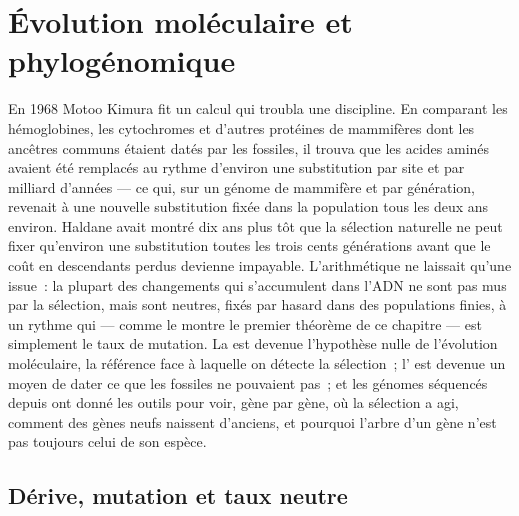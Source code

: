 \chapter{Évolution moléculaire et phylogénomique}\label{ch:b3:molecular-evolution}

En 1968 Motoo Kimura fit un calcul qui troubla une discipline. En
comparant les hémoglobines, les cytochromes et d'autres protéines de
mammifères dont les ancêtres communs étaient datés par les fossiles, il
trouva que les acides aminés avaient été remplacés au rythme d'environ
une substitution par site et par milliard d'années --- ce qui, sur un
génome de mammifère et par génération, revenait à une nouvelle
substitution fixée dans la population tous les deux ans environ. Haldane
avait montré dix ans plus tôt que la sélection naturelle ne peut fixer
qu'environ une substitution toutes les trois cents générations avant que
le coût en descendants perdus devienne impayable. L'arithmétique ne
laissait qu'une issue~: la plupart des changements qui s'accumulent dans
l'ADN ne sont pas mus par la sélection, mais sont neutres, fixés par
hasard dans des populations finies, à un rythme qui --- comme le montre
le premier théorème de ce chapitre --- est simplement le taux de
mutation. La  est devenue l'hypothèse nulle de
l'évolution moléculaire, la référence face à laquelle on détecte la
sélection~; l' est devenue un moyen de dater ce que
les fossiles ne pouvaient pas~; et les génomes séquencés depuis ont
donné les outils pour voir, gène par gène, où la sélection a agi,
comment des gènes neufs naissent d'anciens, et pourquoi l'arbre d'un
gène n'est pas toujours celui de son espèce.

\section{Dérive, mutation et taux neutre}

